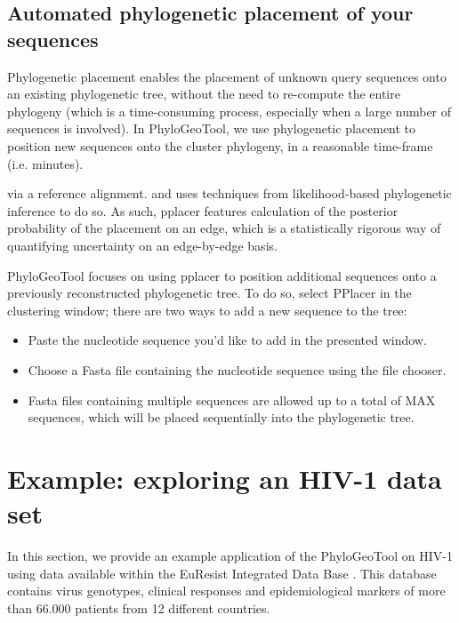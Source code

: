 \documentclass[a4paper, 11pt]{article} %
\begin{document}
\subsection{Automated phylogenetic placement of your sequences}
Phylogenetic placement enables the placement of unknown query sequences onto an existing phylogenetic tree, without the need to re-compute the entire phylogeny (which is a time-consuming process, especially when a large number of sequences is involved). In PhyloGeoTool, we use phylogenetic placement to position new sequences onto the cluster phylogeny, in a reasonable time-frame (i.e. minutes).

 via a reference alignment. and uses techniques from likelihood-based phylogenetic inference to do so.
As such, pplacer features calculation of the posterior probability of the placement on an edge, which is a statistically rigorous way of quantifying uncertainty on an edge-by-edge basis.

PhyloGeoTool focuses on using pplacer to position additional sequences onto a previously reconstructed phylogenetic tree.
To do so, select PPlacer in the clustering window; there are two ways to add a new sequence to the tree:
\begin{itemize}
\item Paste the nucleotide sequence you'd like to add in the presented window.
\item Choose a Fasta file containing the nucleotide sequence using the file chooser.
\item Fasta files containing multiple sequences are allowed up to a total of MAX sequences, which will be placed sequentially into the phylogenetic tree.
\end{itemize}



\section{Example: exploring an HIV-1 data set}

In this section, we provide an example application of the PhyloGeoTool on HIV-1 using data available within the EuResist Integrated Data Base \citep{Zazzi2012}. 
This database contains virus genotypes, clinical responses and epidemiological markers of more than 66.000 patients from 12 different countries.

\end{document}
